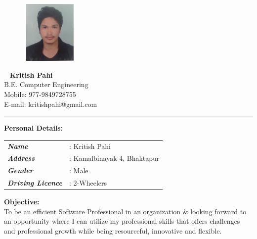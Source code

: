 \documentclass[hidelinks,a4paper, 12pt]{article}
\begin{document}
\pagestyle{empty}




\begin{figure}
	\includegraphics[height=1.20in, width=1.10in]{k}
\end{figure}
~
{\Huge
	\textbf{Kritish Pahi} \\}
	B.E. Computer Engineering\\
	{Mobile: 977-9849728755}\\
	{E-mail: kritishpahi@gmail.com}\\
\vspace{2.2mm}
	
 \rule[2pt]{0.9\textwidth}{1pt}
\vspace{1mm}

{ \Large \textbf{Personal Details:}\\
}
\begin{tabular}{l l}
	 \textbf{\emph{Name }} & : Kritish Pahi \\
	 \textbf{\emph{Address }}&  : Kamalbinayak 4, Bhaktapur \\
	 \textbf{\emph{Gender }} & : Male \\
	 \textbf{\emph{Driving Licence}} & : 2-Wheelers 
\end{tabular}
\vspace{8mm}

{\Large \textbf{Objective:} \\ 
}
To be an efficient Software Professional in an organization \& looking forward
to an opportunity where I can utilize my professional skills that offers 
challenges and professional growth while being resourceful, innovative 
and flexible.
\end{document}
